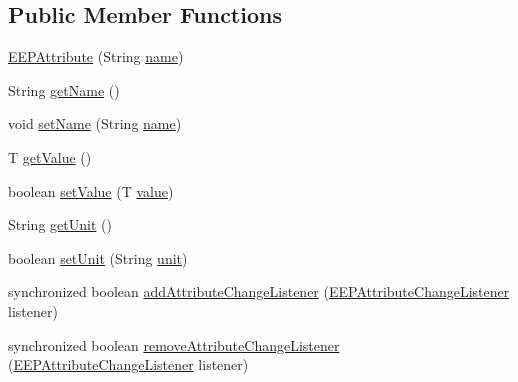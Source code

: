 \subsection*{Public Member Functions}
\begin{DoxyCompactItemize}
\item 
\hyperlink{classit_1_1polito_1_1elite_1_1enocean_1_1enj_1_1eep_1_1_e_e_p_attribute_a489224c38bd4f7bb791fca3d8131bcd1}{E\+E\+P\+Attribute} (String \hyperlink{classit_1_1polito_1_1elite_1_1enocean_1_1enj_1_1eep_1_1_e_e_p_attribute_a1027c0dda631c419cfecf58a8790f61c}{name})
\item 
String \hyperlink{classit_1_1polito_1_1elite_1_1enocean_1_1enj_1_1eep_1_1_e_e_p_attribute_a3d60ab7df4e3a06e65f73a180aca49df}{get\+Name} ()
\item 
void \hyperlink{classit_1_1polito_1_1elite_1_1enocean_1_1enj_1_1eep_1_1_e_e_p_attribute_a63a7a95832e2f86c9401d4fbaad6cbb5}{set\+Name} (String \hyperlink{classit_1_1polito_1_1elite_1_1enocean_1_1enj_1_1eep_1_1_e_e_p_attribute_a1027c0dda631c419cfecf58a8790f61c}{name})
\item 
T \hyperlink{classit_1_1polito_1_1elite_1_1enocean_1_1enj_1_1eep_1_1_e_e_p_attribute_a4e681931c6ba79eec202bb2fcb34f1ac}{get\+Value} ()
\item 
boolean \hyperlink{classit_1_1polito_1_1elite_1_1enocean_1_1enj_1_1eep_1_1_e_e_p_attribute_a981147db1b664e88723337107875950b}{set\+Value} (T \hyperlink{classit_1_1polito_1_1elite_1_1enocean_1_1enj_1_1eep_1_1_e_e_p_attribute_af4d7e34642004bb6ccfae51e925c983d}{value})
\item 
String \hyperlink{classit_1_1polito_1_1elite_1_1enocean_1_1enj_1_1eep_1_1_e_e_p_attribute_a881aa5b7ef75355b5a2af18cc85ee135}{get\+Unit} ()
\item 
boolean \hyperlink{classit_1_1polito_1_1elite_1_1enocean_1_1enj_1_1eep_1_1_e_e_p_attribute_a08885072bde028f51dbe5eb0ca84e4d6}{set\+Unit} (String \hyperlink{classit_1_1polito_1_1elite_1_1enocean_1_1enj_1_1eep_1_1_e_e_p_attribute_a3fe5b3d613c30066354ad66eeb23b8ae}{unit})
\item 
synchronized boolean \hyperlink{classit_1_1polito_1_1elite_1_1enocean_1_1enj_1_1eep_1_1_e_e_p_attribute_a4b90f971b342110a42ad49ac936bb1af}{add\+Attribute\+Change\+Listener} (\hyperlink{interfaceit_1_1polito_1_1elite_1_1enocean_1_1enj_1_1eep_1_1_e_e_p_attribute_change_listener}{E\+E\+P\+Attribute\+Change\+Listener} listener)
\item 
synchronized boolean \hyperlink{classit_1_1polito_1_1elite_1_1enocean_1_1enj_1_1eep_1_1_e_e_p_attribute_a22c278357123a4200f105354304aa904}{remove\+Attribute\+Change\+Listener} (\hyperlink{interfaceit_1_1polito_1_1elite_1_1enocean_1_1enj_1_1eep_1_1_e_e_p_attribute_change_listener}{E\+E\+P\+Attribute\+Change\+Listener} listener)

\end{DoxyCompactItemize}
